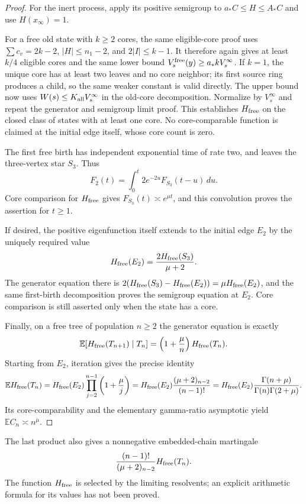 \begin{proof}
For the inert process, apply its positive semigroup to
$a_*C\le H\le A_*C$ and use $H(x_\infty)=1$.

For a free old state with $k\ge2$ cores, the same eligible-core proof
uses $\sum c_v=2k-2$, $|H|\le n_1-2$, and
$2|I|\le k-1$.  It therefore again gives at least $k/4$ eligible
cores and the same lower bound
$V_s^{\rm free}(y)\ge a_*kV_s^\infty$.
If $k=1$, the unique core has at least two leaves and no core neighbor;
its first source ring produces a child, so the same weaker constant
is valid directly.  The upper bound now uses
$W(s)\le K_{\rm all}V_s^\infty$ in the old-core decomposition.
Normalize by $V_s^\infty$ and repeat the generator and semigroup
limit proof.  This establishes $H_{\rm free}$ on the closed class
of states with at least one core.  No core-comparable function is
claimed at the initial edge itself, whose core count is zero.

The first free birth has independent exponential time of rate two,
and leaves the three-vertex star $S_3$.  Thus
\[
 F_2(t)=\int_0^t2e^{-2u}F_{S_3}(t-u)\,du.
\]
Core comparison for $H_{\rm free}$ gives
$F_{S_3}(t)\asymp e^{\mu t}$, and this convolution proves the assertion
for $t\ge1$.

If desired, the positive eigenfunction itself extends to the initial
edge $E_2$ by the uniquely required value
\[
 H_{\rm free}(E_2)=\frac{2H_{\rm free}(S_3)}{\mu+2}.
\]
The generator equation there is
$2(H_{\rm free}(S_3)-H_{\rm free}(E_2))
 =\mu H_{\rm free}(E_2)$, and the same first-birth decomposition
proves the semigroup equation at $E_2$.  Core comparison is still
asserted only when the state has a core.

Finally, on a free tree of population $n\ge2$ the generator equation
is exactly
\[
 \mathbb E[H_{\rm free}(T_{n+1})\mid T_n]
  =\left(1+\frac\mu n\right)H_{\rm free}(T_n).
\]
Starting from $E_2$, iteration gives the precise identity
\[
 \mathbb E H_{\rm free}(T_n)
 =H_{\rm free}(E_2)
   \prod_{j=2}^{n-1}\left(1+\frac\mu j\right)
 =H_{\rm free}(E_2)
   \frac{(\mu+2)_{n-2}}{(n-1)!}
 =H_{\rm free}(E_2)
   \frac{\Gamma(n+\mu)}{\Gamma(n)\Gamma(2+\mu)}.
\]
Its core-comparability and the elementary gamma-ratio asymptotic yield
$\mathbb E C_n\asymp n^\mu$.
\end{proof}

The last product also gives a nonnegative embedded-chain martingale
\[
 \frac{(n-1)!}{(\mu+2)_{n-2}}H_{\rm free}(T_n).
\]
The function $H_{\rm free}$ is selected by the limiting resolvents; an
explicit arithmetic formula for its values has not been proved.

